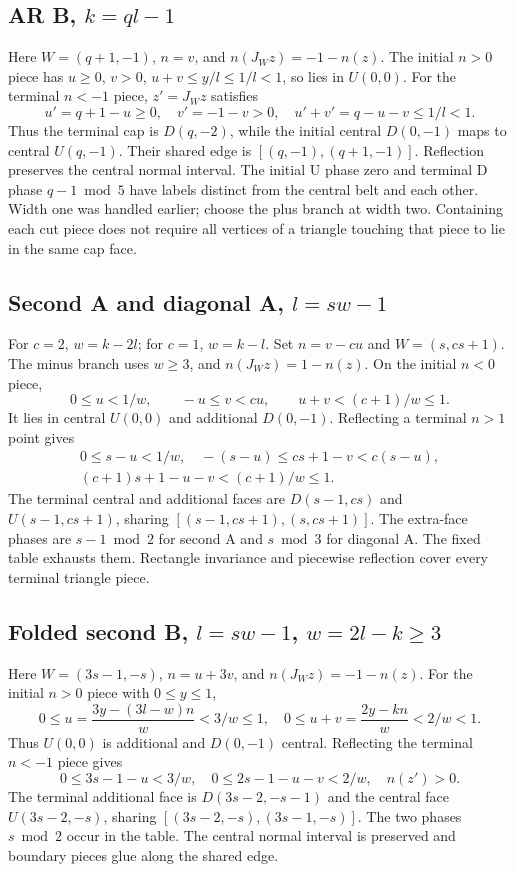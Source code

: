 \documentclass[11pt]{amsart}
\begin{document}
\subsection{AR B, \texorpdfstring{$k=ql-1$}{k=ql-1}}
Here $W=(q+1,-1)$, $n=v$, and $n(J_Wz)=-1-n(z)$.
The initial $n>0$ piece has $u\ge0$, $v>0$,
$u+v\le y/l\le1/l<1$, so lies in $U(0,0)$.
For the terminal $n<-1$ piece, $z'=J_Wz$ satisfies
\[
u'=q+1-u\ge0,\quad v'=-1-v>0,\quad
u'+v'=q-u-v\le1/l<1.
\]
Thus the terminal cap is $D(q,-2)$, while the initial central
$D(0,-1)$ maps to central $U(q,-1)$. Their shared edge is
$[(q,-1),(q+1,-1)]$. Reflection preserves the central normal interval.
The initial U phase zero and terminal D phase $q-1\bmod5$ have labels
distinct from the central belt and each other. Width one was handled
earlier; choose the plus branch at width two. Containing each cut piece
does not require all vertices of a triangle touching that piece to
lie in the same cap face.

\subsection{Second A and diagonal A, \texorpdfstring{$l=sw-1$}{l=sw-1}}
For $c=2$, $w=k-2l$; for $c=1$, $w=k-l$. Set $n=v-cu$ and
$W=(s,cs+1)$. The minus branch uses $w\ge3$, and
$n(J_Wz)=1-n(z)$. On the initial $n<0$ piece,
\[
0\le u<1/w,\qquad -u\le v<cu,\qquad u+v<(c+1)/w\le1.
\]
It lies in central $U(0,0)$ and additional $D(0,-1)$. Reflecting a
terminal $n>1$ point gives
\[
\begin{gathered}
0\le s-u<1/w,\quad -(s-u)\le cs+1-v<c(s-u),\\
(c+1)s+1-u-v<(c+1)/w\le1.
\end{gathered}
\]
The terminal central and additional faces are $D(s-1,cs)$ and
$U(s-1,cs+1)$, sharing $[(s-1,cs+1),(s,cs+1)]$.
The extra-face phases are $s-1\bmod2$ for second A and $s\bmod3$
for diagonal A. The fixed table exhausts them. Rectangle invariance
and piecewise reflection cover every terminal triangle piece.

\subsection{Folded second B, \texorpdfstring{$l=sw-1$, $w=2l-k\ge3$}{l=sw-1, w=2l-k >= 3}}
Here $W=(3s-1,-s)$, $n=u+3v$, and $n(J_Wz)=-1-n(z)$.
For the initial $n>0$ piece with $0\le y\le1$,
\[
0\le u=\frac{3y-(3l-w)n}{w}<3/w\le1,\quad
0\le u+v=\frac{2y-kn}{w}<2/w<1.
\]
Thus $U(0,0)$ is additional and $D(0,-1)$ central. Reflecting the
terminal $n<-1$ piece gives
\[
0\le3s-1-u<3/w,\quad0\le2s-1-u-v<2/w,\quad n(z')>0.
\]
The terminal additional face is $D(3s-2,-s-1)$ and the central face
$U(3s-2,-s)$, sharing $[(3s-2,-s),(3s-1,-s)]$.
The two phases $s\bmod2$ occur in the table. The central normal
interval is preserved and boundary pieces glue along the shared edge.
\end{document}
